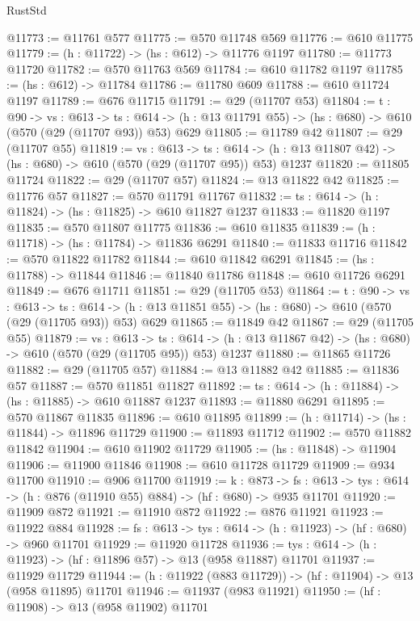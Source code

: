 \begin{lexlean}{RustStd}
\begin{coremodule}
@11773 := @11761 @577
@11775 := @570 @11748 @569
@11776 := @610 @11775
@11779 := (h : @11722) -> (hs : @612) -> @11776 @1197
@11780 := @11773 @11720
@11782 := @570 @11763 @569
@11784 := @610 @11782 @1197
@11785 := (hs : @612) -> @11784
@11786 := @11780 @609
@11788 := @610 @11724 @1197
@11789 := @676 @11715
@11791 := @29 (@11707 @53)
@11804 := {t : @90} ->
  {vs : @613} ->
  {ts : @614} -> (h : @13 @11791 @55) -> (hs : @680) -> @610 (@570 (@29 (@11707 @93)) @53) @629
@11805 := @11789 @42
@11807 := @29 (@11707 @55)
@11819 := {vs : @613} ->
  {ts : @614} -> (h : @13 @11807 @42) -> (hs : @680) -> @610 (@570 (@29 (@11707 @95)) @53) @1237
@11820 := @11805 @11724
@11822 := @29 (@11707 @57)
@11824 := @13 @11822 @42
@11825 := @11776 @57
@11827 := @570 @11791 @11767
@11832 := {ts : @614} -> (h : @11824) -> (hs : @11825) -> @610 @11827 @1237
@11833 := @11820 @1197
@11835 := @570 @11807 @11775
@11836 := @610 @11835
@11839 := (h : @11718) -> (hs : @11784) -> @11836 @6291
@11840 := @11833 @11716
@11842 := @570 @11822 @11782
@11844 := @610 @11842 @6291
@11845 := (hs : @11788) -> @11844
@11846 := @11840 @11786
@11848 := @610 @11726 @6291
@11849 := @676 @11711
@11851 := @29 (@11705 @53)
@11864 := {t : @90} ->
  {vs : @613} ->
  {ts : @614} -> (h : @13 @11851 @55) -> (hs : @680) -> @610 (@570 (@29 (@11705 @93)) @53) @629
@11865 := @11849 @42
@11867 := @29 (@11705 @55)
@11879 := {vs : @613} ->
  {ts : @614} -> (h : @13 @11867 @42) -> (hs : @680) -> @610 (@570 (@29 (@11705 @95)) @53) @1237
@11880 := @11865 @11726
@11882 := @29 (@11705 @57)
@11884 := @13 @11882 @42
@11885 := @11836 @57
@11887 := @570 @11851 @11827
@11892 := {ts : @614} -> (h : @11884) -> (hs : @11885) -> @610 @11887 @1237
@11893 := @11880 @6291
@11895 := @570 @11867 @11835
@11896 := @610 @11895
@11899 := (h : @11714) -> (hs : @11844) -> @11896 @11729
@11900 := @11893 @11712
@11902 := @570 @11882 @11842
@11904 := @610 @11902 @11729
@11905 := (hs : @11848) -> @11904
@11906 := @11900 @11846
@11908 := @610 @11728 @11729
@11909 := @934 @11700
@11910 := @906 @11700
@11919 := {k : @873} ->
  {fs : @613} -> {tys : @614} -> (h : @876 (@11910 @55) @884) -> (hf : @680) -> @935 @11701
@11920 := @11909 @872
@11921 := @11910 @872
@11922 := @876 @11921
@11923 := @11922 @884
@11928 := {fs : @613} -> {tys : @614} -> (h : @11923) -> (hf : @680) -> @960 @11701
@11929 := @11920 @11728
@11936 := {tys : @614} -> (h : @11923) -> (hf : @11896 @57) -> @13 (@958 @11887) @11701
@11937 := @11929 @11729
@11944 := (h : @11922 (@883 @11729)) -> (hf : @11904) -> @13 (@958 @11895) @11701
@11946 := @11937 (@983 @11921)
@11950 := (hf : @11908) -> @13 (@958 @11902) @11701

\end{coremodule}
\end{lexlean}
